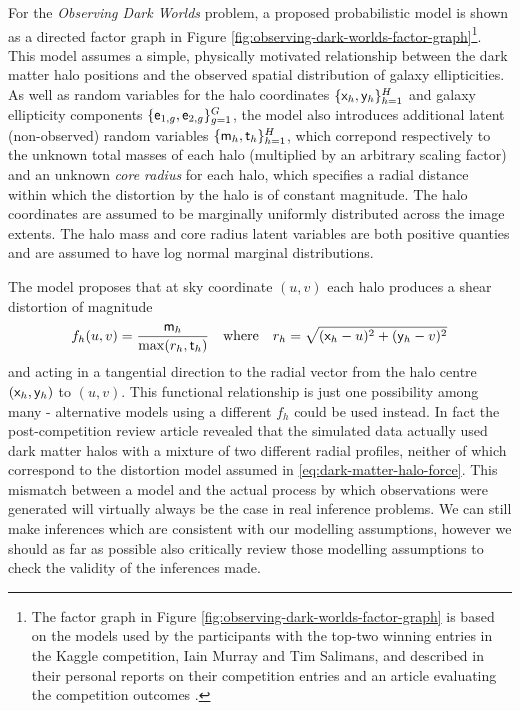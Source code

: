 For the \emph{Observing Dark Worlds} problem, a proposed probabilistic model is shown as a directed factor graph in Figure \ref{fig:observing-dark-worlds-factor-graph}\footnote{The factor graph in Figure \ref{fig:observing-dark-worlds-factor-graph} is based on the models used by the participants with the top-two winning entries in the Kaggle competition, Iain Murray and Tim Salimans, and described in their personal reports on their competition entries \citep{salimans2012observing,murray2012bayesian} and an article evaluating the competition outcomes \citep{harvey2014observing}.}. This model assumes a simple, physically motivated relationship between the dark matter halo positions and the observed spatial distribution of galaxy ellipticities. As well as random variables for the halo coordinates $\lbrace \mathsf{x}_h,\mathsf{y}_h \rbrace_{h=1}^H$ and galaxy ellipticity components $\lbrace \mathsf{e}_{1,g},\mathsf{e}_{2,g} \rbrace_{g=1}^G$, the model also introduces additional latent (non-observed) random variables $\lbrace \mathsf{m}_{h}, \mathsf{t}_h \rbrace_{h=1}^H$, which correpond respectively to the unknown total masses of each halo (multiplied by an arbitrary scaling factor) and an unknown \emph{core radius} for each halo, which specifies a radial distance within which the distortion by the halo is of constant magnitude. The halo coordinates are assumed to be marginally uniformly distributed across the image extents. The halo mass and core radius latent variables are both positive quanties and are assumed to have log normal marginal distributions.

The model proposes that at sky coordinate $(u,v)$ each halo produces a shear distortion of magnitude
\begin{equation}\label{eq:dark-matter-halo-force}
  f_h(u,v) = \frac{\mathsf{m}_h}{\max(r_h,\mathsf{t}_h)}
  \quad\textrm{where}\quad
  r_h = \sqrt{(\mathsf{x}_h - u)^2 + (\mathsf{y}_h - v)^2}
\end{equation}
and acting in a tangential direction to the radial vector from the halo centre $(\mathsf{x}_h,\mathsf{y}_h)$ to $(u,v)$. %
This functional relationship is just one possibility among many - alternative models using a different $f_h$ could be used instead. In fact the post-competition review article \citep{jullo2007bayesian} revealed that the simulated data actually used dark matter halos with a mixture of two different radial profiles, neither of which correspond to the distortion model assumed in \eqref{eq:dark-matter-halo-force}. This mismatch between a model and the actual process by which observations were generated will virtually always be the case in real inference problems. We can still make inferences which are consistent with our modelling assumptions, however we should as far as possible also critically review those modelling assumptions to check the validity of the inferences made.

